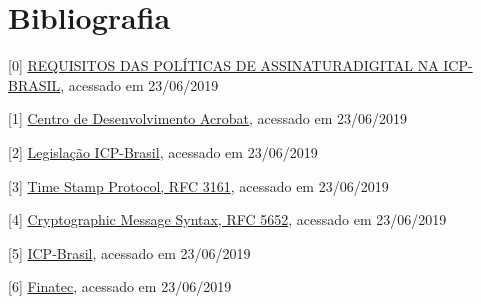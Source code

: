 \chapter[Bibliografia]{Bibliografia}

[0] \href{https://www.iti.gov.br/images/repositorio/legislacao/documentos-principais/DOC-ICP-15.03_-_Versao_7.4_REQ_DAS_POL_DE_ASSIN_DIG_NA_ICP-BRASIL.pdf}{REQUISITOS DAS POLÍTICAS DE ASSINATURADIGITAL NA ICP-BRASIL}, acessado em 23/06/2019

[1] \href{https://www.adobe.com/devnet/acrobat.html}{Centro de Desenvolvimento Acrobat}, acessado em 23/06/2019

[2] \href{https://www.iti.gov.br/legislacao}{Legislação ICP-Brasil}, acessado em 23/06/2019

[3] \href{https://www.ietf.org/rfc/rfc3161.txt}{Time Stamp Protocol, RFC 3161}, acessado em 23/06/2019

[4] \href{https://tools.ietf.org/html/rfc5652}{Cryptographic Message Syntax, RFC 5652}, acessado em 23/06/2019

[5] \href{https://www.iti.gov.br/icp-brasil}{ICP-Brasil}, acessado em 23/06/2019

[6] \href{http://www.finatec.org.br}{Finatec}, acessado em 23/06/2019
